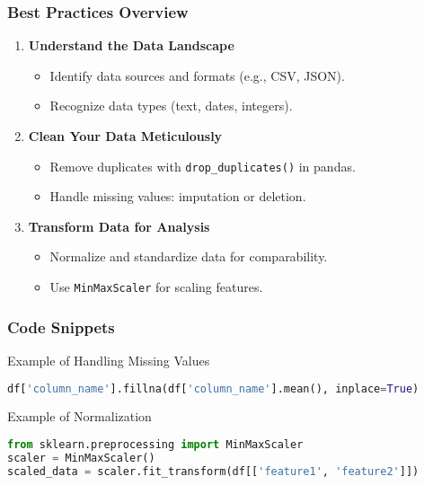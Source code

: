 \documentclass[aspectratio=169]{beamer}
\begin{document}
\begin{frame}
    \frametitle{Best Practices Overview}
    \begin{enumerate}
        \item \textbf{Understand the Data Landscape}
            \begin{itemize}
                \item Identify data sources and formats (e.g., CSV, JSON).
                \item Recognize data types (text, dates, integers).
            \end{itemize}
        \item \textbf{Clean Your Data Meticulously}
            \begin{itemize}
                \item Remove duplicates with \texttt{drop\_duplicates()} in pandas.
                \item Handle missing values: imputation or deletion.
            \end{itemize}
        \item \textbf{Transform Data for Analysis}
            \begin{itemize}
                \item Normalize and standardize data for comparability.
                \item Use \texttt{MinMaxScaler} for scaling features.
            \end{itemize}
    \end{enumerate}
\end{frame}

\begin{frame}[fragile]
    \frametitle{Code Snippets}
    \begin{block}{Example of Handling Missing Values}
        \begin{lstlisting}[language=Python]
df['column_name'].fillna(df['column_name'].mean(), inplace=True)
        \end{lstlisting}
    \end{block}

    \begin{block}{Example of Normalization}
        \begin{lstlisting}[language=Python]
from sklearn.preprocessing import MinMaxScaler
scaler = MinMaxScaler()
scaled_data = scaler.fit_transform(df[['feature1', 'feature2']])
        \end{lstlisting}
    \end{block}
\end{frame}
\end{document}

